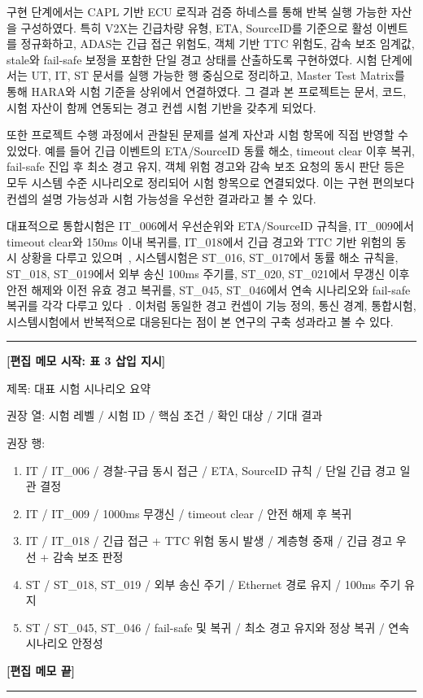\documentclass[11pt,a4paper]{article}
\newenvironment{editmemo}[1]
{
\par\noindent\rule{\linewidth}{0.4pt}\par
\noindent\textbf{[편집 메모 시작: #1]}\par
\small\itshape
}
{
\par\normalsize\normalfont
\noindent\textbf{[편집 메모 끝]}\par
\noindent\rule{\linewidth}{0.4pt}\par
}
\begin{document}
구현 단계에서는 CAPL 기반 ECU 로직과 검증 하네스를 통해 반복 실행 가능한 자산을 구성하였다. 특히 V2X는 긴급차량 유형, ETA, SourceID를 기준으로 활성 이벤트를 정규화하고, ADAS는 긴급 접근 위험도, 객체 기반 TTC 위험도, 감속 보조 임계값, stale와 fail-safe 보정을 포함한 단일 경고 상태를 산출하도록 구현하였다. 시험 단계에서는 UT, IT, ST 문서를 실행 가능한 행 중심으로 정리하고, Master Test Matrix를 통해 HARA와 시험 기준을 상위에서 연결하였다. 그 결과 본 프로젝트는 문서, 코드, 시험 자산이 함께 연동되는 경고 컨셉 시험 기반을 갖추게 되었다.

또한 프로젝트 수행 과정에서 관찰된 문제를 설계 자산과 시험 항목에 직접 반영할 수 있었다. 예를 들어 긴급 이벤트의 ETA/SourceID 동률 해소, timeout clear 이후 복귀, fail-safe 진입 후 최소 경고 유지, 객체 위험 경고와 감속 보조 요청의 동시 판단 등은 모두 시스템 수준 시나리오로 정리되어 시험 항목으로 연결되었다. 이는 구현 편의보다 컨셉의 설명 가능성과 시험 가능성을 우선한 결과라고 볼 수 있다.

대표적으로 통합시험은 IT\_006에서 우선순위와 ETA/SourceID 규칙을, IT\_009에서 timeout clear와 150ms 이내 복귀를, IT\_018에서 긴급 경고와 TTC 기반 위험의 동시 상황을 다루고 있으며~\cite{integration_test}, 시스템시험은 ST\_016, ST\_017에서 동률 해소 규칙을, ST\_018, ST\_019에서 외부 송신 100ms 주기를, ST\_020, ST\_021에서 무갱신 이후 안전 해제와 이전 유효 경고 복귀를, ST\_045, ST\_046에서 연속 시나리오와 fail-safe 복귀를 각각 다루고 있다~\cite{system_test}. 이처럼 동일한 경고 컨셉이 기능 정의, 통신 경계, 통합시험, 시스템시험에서 반복적으로 대응된다는 점이 본 연구의 구축 성과라고 볼 수 있다.

\begin{editmemo}{표 3 삽입 지시}
제목: 대표 시험 시나리오 요약

권장 열: 시험 레벨 / 시험 ID / 핵심 조건 / 확인 대상 / 기대 결과

권장 행:
\begin{enumerate}[label=\arabic*.]
\item IT / IT\_006 / 경찰-구급 동시 접근 / ETA, SourceID 규칙 / 단일 긴급 경고 일관 결정
\item IT / IT\_009 / 1000ms 무갱신 / timeout clear / 안전 해제 후 복귀
\item IT / IT\_018 / 긴급 접근 + TTC 위험 동시 발생 / 계층형 중재 / 긴급 경고 우선 + 감속 보조 판정
\item ST / ST\_018, ST\_019 / 외부 송신 주기 / Ethernet 경로 유지 / 100ms 주기 유지
\item ST / ST\_045, ST\_046 / fail-safe 및 복귀 / 최소 경고 유지와 정상 복귀 / 연속 시나리오 안정성
\end{enumerate}
\end{editmemo}
\end{document}
